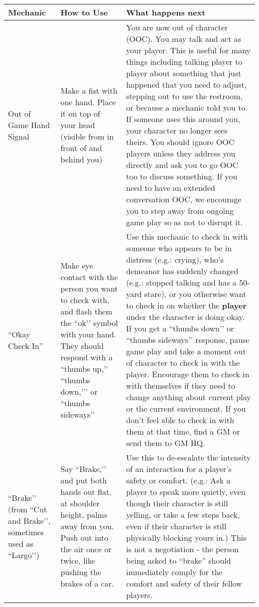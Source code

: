 \documentclass[sheet]{GL2020}
\begin{document}
\begin{tabularx}{\textwidth}{|>{\centering\arraybackslash} m{1.5cm} | >{\centering\arraybackslash} m{2.5cm} | >{\centering\arraybackslash}X |}
\hline 
 \textbf{Mechanic} & \textbf{How to Use} & \textbf{What happens next} \\
\hline
Out of Game Hand Signal & Make a fist with one hand. Place it on top of your head (visible from in front of and behind you) & You are now out of character (OOC). You may talk and act as your player. This is useful for many things including talking player to player about something that just happened that you need to adjust, stepping out to use the restroom, or because a mechanic told you to. If someone uses this around you, your character no longer sees theirs. You should ignore OOC players unless they address you directly and ask you to go OOC too to discuss something. If you need to have an extended conversation OOC, we encourage you to step away from ongoing game play so as not to disrupt it. \\
    \hline
``Okay Check In'’ & Make eye contact with the person you want to check with, and flash them the ``ok'’ symbol with your hand. They should respond with a ``thumbs up,'’ ``thumbs down,'’' or ``thumbs sideways'’ & Use this mechanic to check in with someone who appears to be in distress (e.g.: crying), who's demeanor has suddenly changed (e.g.: stopped talking and has a 50-yard stare), or you otherwise want to check in on whether the \textbf{player} under the character is doing okay. If you get a ``thumbs down'’ or ``thumbs sideways'’ response, pause game play and take a moment out of character to check in with the player. Encourage them to check in with themselves if they need to change anything about current play or the current environment. If you don't feel able to check in with them at that time, find a GM or send them to GM HQ.\\
    \hline
``Brake'’ (from ``Cut and Brake'’, sometimes used as ``Largo'’) & Say ``Brake,'’ and put both hands out flat, at shoulder height, palms away from you. Push out into the air once or twice, like pushing the brakes of a car. & Use this to de-escalate the intensity of an interaction for a player's safety or comfort. (e.g.: Ask a player to speak more quietly, even though their character is still yelling, or take a few steps back, even if their character is still physically blocking yours in.) This is not a negotiation - the person being asked to ``brake'' should immediately comply for the comfort and safety of their fellow players. \\

\end{tabularx}
\end{document}
